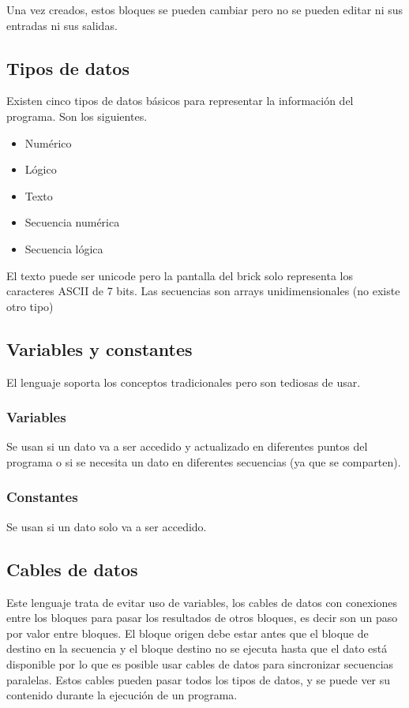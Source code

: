 \documentclass[12pt,a4paper]{article}
\begin{document}
Una vez creados, estos bloques se pueden cambiar pero no se pueden editar ni sus
entradas ni sus salidas.

\subsection{Tipos de datos}

Existen cinco tipos de datos básicos para representar la información del
programa. Son los siguientes.

\begin{itemize}
\item Numérico
\item Lógico
\item Texto
\item Secuencia numérica
\item Secuencia lógica
\end{itemize}

El texto puede ser unicode pero la pantalla del brick solo representa los
caracteres ASCII de 7 bits. Las secuencias son arrays unidimensionales (no existe
otro tipo)

\subsection{Variables y constantes}

El lenguaje soporta los conceptos tradicionales pero son tediosas de usar.

\subsubsection{Variables}

Se usan si un dato va a ser accedido y actualizado en diferentes puntos del
programa o si se necesita un dato en diferentes secuencias (ya que se
comparten).

\subsubsection{Constantes}

Se usan si un dato solo va a ser accedido.

\subsection{Cables de datos}

Este lenguaje trata de evitar uso de variables, los cables de datos con
conexiones entre los bloques para pasar los resultados de otros bloques, es
decir son un paso por valor entre bloques. El bloque origen debe estar antes que
el bloque de destino en la secuencia y el bloque destino no se ejecuta hasta que
el dato está disponible por lo que es posible usar cables de datos para
sincronizar secuencias paralelas. Estos cables pueden pasar todos los tipos de
datos, y se puede ver su contenido durante la ejecución de un programa.
\end{document}
